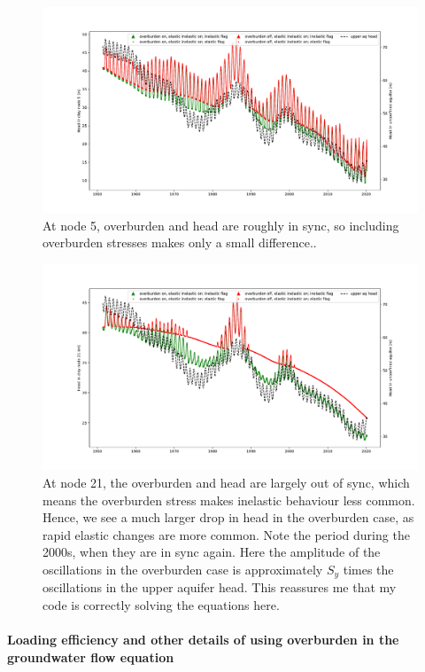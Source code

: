 \documentclass{article}
\begin{document}
\begin{figure}
\includegraphics[width=\linewidth]{BasicIllustration_ElasticInelastic_n5.pdf}
\caption{At node 5, overburden and head are roughly in sync, so including overburden stresses makes only a small difference..}
\label{fig:overburden4}
\end{figure}

\begin{figure}
\includegraphics[width=\linewidth]{BasicIllustration_ElasticInelastic_n21.pdf}
\caption{At node 21, the overburden and head are largely out of sync, which means the overburden stress makes inelastic behaviour less common. Hence, we see a much larger drop in head in the overburden case, as rapid elastic changes are more common. Note the period during the 2000s, when they are in sync again. Here the amplitude of the oscillations in the overburden case is approximately $S_y$ times the oscillations in the upper aquifer head. This reassures me that my code is correctly solving the equations here.}
\label{fig:overburden5}
\end{figure}

\paragraph{Loading efficiency and other details of using overburden in the groundwater flow equation}
\end{document}
